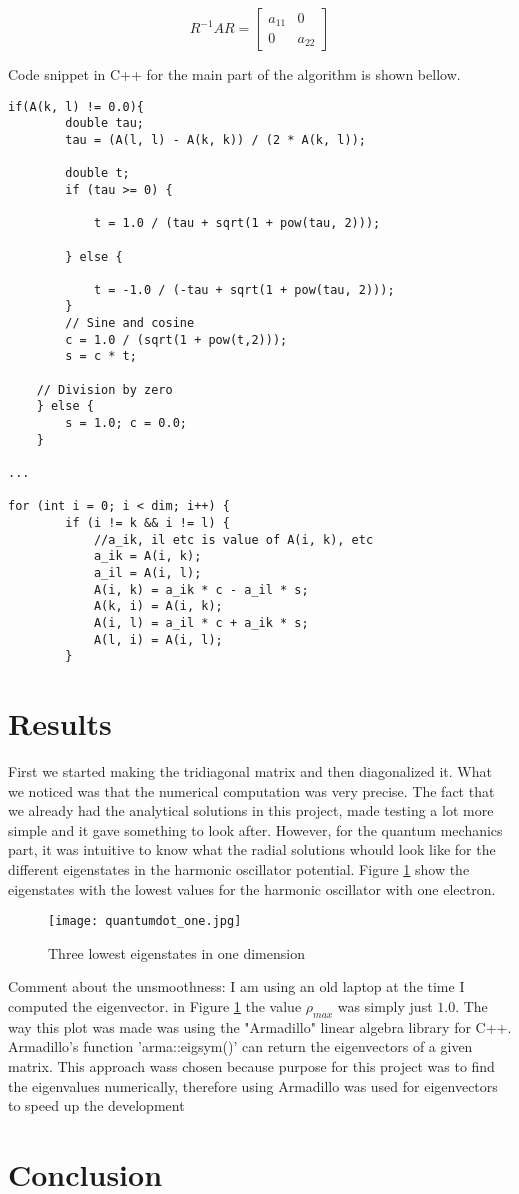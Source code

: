 \documentclass{article}
\begin{document}
$$
R^{-1}AR = \begin{bmatrix}
a_{11} & 0 \\
0 & a_{22}
\end{bmatrix}
$$

Code snippet in C++ for the main part of the algorithm is shown bellow.
\begin{lstlisting}
if(A(k, l) != 0.0){
        double tau;
        tau = (A(l, l) - A(k, k)) / (2 * A(k, l));

        double t;
        if (tau >= 0) {

            t = 1.0 / (tau + sqrt(1 + pow(tau, 2)));

        } else {

            t = -1.0 / (-tau + sqrt(1 + pow(tau, 2)));
        }
        // Sine and cosine
        c = 1.0 / (sqrt(1 + pow(t,2)));
        s = c * t;

    // Division by zero
    } else {
        s = 1.0; c = 0.0;
    }

...

for (int i = 0; i < dim; i++) {
        if (i != k && i != l) {
            //a_ik, il etc is value of A(i, k), etc
            a_ik = A(i, k);
            a_il = A(i, l);
            A(i, k) = a_ik * c - a_il * s;
            A(k, i) = A(i, k);
            A(i, l) = a_il * c + a_ik * s;
            A(l, i) = A(i, l);
        }
\end{lstlisting}


\section{Results}
First we started making the tridiagonal matrix and then diagonalized it. What we noticed was that the numerical computation was very precise. The fact that we already had the analytical solutions in this project, made testing a lot more simple and it gave something to look after. However, for the quantum mechanics part, it was intuitive to know what the radial solutions whould look like for the different eigenstates in the harmonic oscillator potential. Figure \ref{fig:dotone} show the eigenstates with the lowest values for the harmonic oscillator with one electron.
\begin{figure}[H]
\centering
\texttt{[image: quantumdot\_one.jpg]}
\caption{Three lowest eigenstates in one dimension}
\label{fig:dotone}
\end{figure}

Comment about the unsmoothness: I am using an old laptop at the time I computed the eigenvector. in Figure \ref{fig:dotone} the value $\rho_{max}$ was simply just $1.0$. The way this plot was made was using the "Armadillo" linear algebra library for C++. Armadillo's function 'arma::eigsym()' can return the eigenvectors of a given matrix. This approach wass chosen because purpose for this project was to find the eigenvalues numerically, therefore using Armadillo was used for eigenvectors to speed up the development 

\section{Conclusion}
\citep{Project2}



\end{document}
